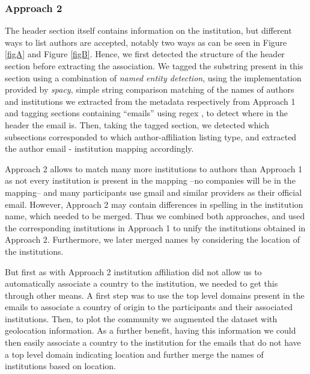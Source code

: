 \documentclass[article,twocolumn]{IEEEtran}
\begin{document}
    \hypertarget{approach-2}{%
\subsubsection{Approach 2}\label{approach-2}}

The header section itself contains information on the institution, but
different ways to list authors are accepted, notably two ways as can be
seen in Figure \ref{figA} and Figure \ref{figB}. Hence, we first
detected the structure of the header section before extracting the
association. We tagged the substring present in this section using a
combination of \emph{named entity detection}, using the implementation
provided by \emph{spacy}, simple string comparison matching of the names
of authors and institutions we extracted from the metadata respectively
from Approach 1 and tagging sections containing ``emails'' using regex ,
to detect where in the header the email is. Then, taking the tagged
section, we detected which subsections corresponded to which
author-affiliation listing type, and extracted the author email -
institution mapping accordingly.

Approach 2 allows to match many more institutions to authors than
Approach 1 as not every institution is present in the mapping --no
companies will be in the mapping-- and many participants use gmail and
similar providers as their official email. However, Approach 2 may
contain differences in spelling in the institution name, which needed to
be merged. Thus we combined both approaches, and used the corresponding
institutions in Approach 1 to unify the institutions obtained in
Approach 2. Furthermore, we later merged names by considering the
location of the institutions.

But first as with Approach 2 institution affiliation did not allow us to
automatically associate a country to the institution, we needed to get
this through other means. A first step was to use the top level domains
present in the emails to associate a country of origin to the
participants and their associated institutions. Then, to plot the
community we augmented the dataset with geolocation information. As a
further benefit, having this information we could then easily associate
a country to the institution for the emails that do not have a top level
domain indicating location and further merge the names of institutions
based on location.
\end{document}

